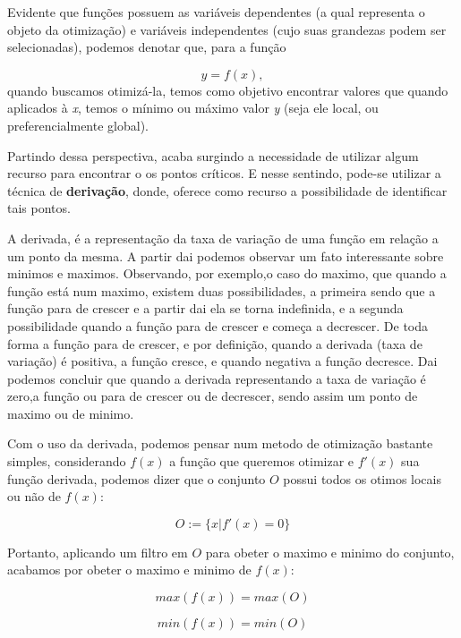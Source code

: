 Evidente que funções possuem as variáveis dependentes (a qual representa o
objeto da otimização) e variáveis independentes (cujo suas grandezas podem ser
selecionadas), podemos denotar que, para a função

\begin{equation}
	y = f(x),
\end{equation}
quando buscamos otimizá-la, temos como objetivo encontrar valores que quando
aplicados à \textit{x}, temos o mínimo ou máximo valor \textit{y} (seja ele
local, ou preferencialmente global).

Partindo dessa perspectiva, acaba surgindo a necessidade de utilizar algum
recurso para encontrar o os pontos críticos. E nesse sentindo, pode-se utilizar
a técnica de \textbf{derivação}, donde, oferece como recurso a possibilidade de
identificar tais pontos.

A derivada, é a representação da taxa de variação de uma função em relação a
um ponto da mesma. A partir dai podemos observar um fato interessante sobre
minimos e maximos. Observando, por exemplo,o caso do maximo, que quando a função
está num maximo, existem duas possibilidades, a primeira sendo que a função para
de crescer e a partir dai ela se torna indefinida, e a segunda possibilidade
quando a função para de crescer e começa a decrescer. De toda forma a função
para de crescer, e por definição, quando a derivada (taxa de variação) é
positiva, a função cresce, e quando negativa a função decresce. Dai podemos
concluir que quando a derivada representando a taxa de variação é zero,a função
ou para de crescer ou de decrescer, sendo assim um ponto de maximo ou de minimo.

Com o uso da derivada, podemos pensar num metodo de otimização bastante simples,
considerando \(f(x)\) a função que queremos otimizar e \(f'(x)\) sua função
derivada, podemos dizer que o conjunto $O$ possui todos os otimos locais ou não
de \(f(x)\):

\begin{equation}
    O := \{x | f'(x) = 0\}
\end{equation}


Portanto, aplicando um filtro em $O$ para obeter o maximo e minimo do conjunto,
acabamos por obeter o maximo e minimo de \(f(x)\):


\begin{equation}
    max(f(x)) = max(O)
\end{equation}

\begin{equation}
    min(f(x)) = min(O)
\end{equation}


